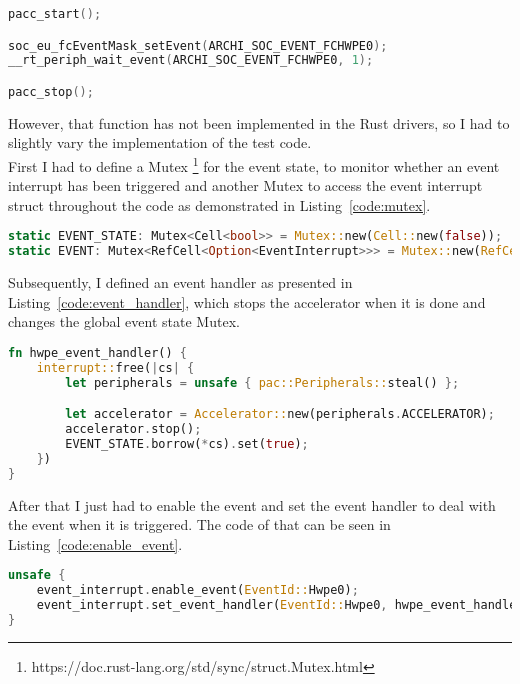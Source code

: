 \begin{lstlisting}[style=colorEX,language=C,caption={Waiting for the event in C},label={code:c_wait_for_event}]
pacc_start();

soc_eu_fcEventMask_setEvent(ARCHI_SOC_EVENT_FCHWPE0);
__rt_periph_wait_event(ARCHI_SOC_EVENT_FCHWPE0, 1);

pacc_stop();
\end{lstlisting}

However, that function has not been implemented in the Rust drivers, so I had to slightly
vary the implementation of the test code.\\
First I had to define a Mutex \footnote{https://doc.rust-lang.org/std/sync/struct.Mutex.html}
for the event state, to monitor whether an event interrupt has been triggered
and another Mutex to access the event interrupt struct throughout the code as demonstrated
in Listing~\ref{code:mutex}.

\begin{lstlisting}[style=colorEX,language=Rust,caption={Definition of the necessary Mutexes},label={code:mutex}]
static EVENT_STATE: Mutex<Cell<bool>> = Mutex::new(Cell::new(false));
static EVENT: Mutex<RefCell<Option<EventInterrupt>>> = Mutex::new(RefCell::new(None));
\end{lstlisting}

Subsequently, I defined an event handler as presented in Listing~\ref{code:event_handler}, which
stops the accelerator when it is done and changes the global event state Mutex.

\begin{lstlisting}[style=colorEX,language=Rust,caption={Event handler function},label={code:event_handler}]
fn hwpe_event_handler() {
    interrupt::free(|cs| {
        let peripherals = unsafe { pac::Peripherals::steal() };

        let accelerator = Accelerator::new(peripherals.ACCELERATOR);
        accelerator.stop();
        EVENT_STATE.borrow(*cs).set(true);
    })
}
\end{lstlisting}

After that I just had to enable the event and set the event handler to deal with the event when it is triggered.
The code of that can be seen in Listing~\ref{code:enable_event}.

\begin{lstlisting}[style=colorEX,language=Rust,caption={Code to enable the hardware event and set the handler},label={code:enable_event}]
unsafe {
    event_interrupt.enable_event(EventId::Hwpe0);
    event_interrupt.set_event_handler(EventId::Hwpe0, hwpe_event_handler);
}
\end{lstlisting}

